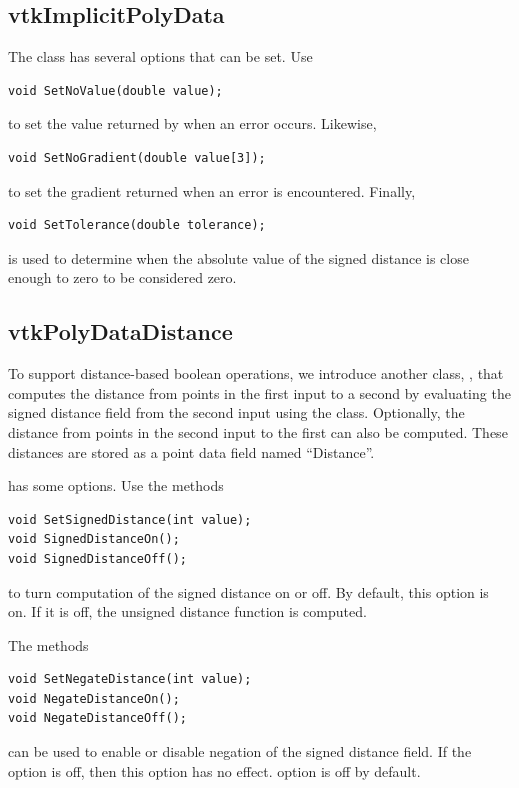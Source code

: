 \documentclass{InsightArticle}
\begin{document}
\subsection{vtkImplicitPolyData}

The class  has several options that can be set. Use
\begin{verbatim}
void SetNoValue(double value);
\end{verbatim}
to set the value returned by  when an error occurs. Likewise,
\begin{verbatim}
void SetNoGradient(double value[3]);
\end{verbatim}
to set the gradient returned when an error is encountered. Finally,
\begin{verbatim}
void SetTolerance(double tolerance);
\end{verbatim}
is used to determine when the absolute value of the signed distance is close enough to zero to be considered zero.

\subsection{vtkPolyDataDistance}

To support distance-based boolean operations, we introduce another class, , that computes the distance from points in the first input  to a second by evaluating the signed distance field from the second input using the  class. Optionally, the distance from points in the second input  to the first can also be computed. These distances are stored as a point data field named ``Distance''.

 has some options. Use the methods
\begin{verbatim}
void SetSignedDistance(int value);
void SignedDistanceOn();
void SignedDistanceOff();
\end{verbatim}
to turn computation of the signed distance on or off. By default, this option is on. If it is off, the unsigned distance function is computed.

The methods
\begin{verbatim}
void SetNegateDistance(int value);
void NegateDistanceOn();
void NegateDistanceOff();
\end{verbatim}
can be used to enable or disable negation of the signed distance field. If the  option is off, then this option has no effect.  option is off by default.
\end{document}

